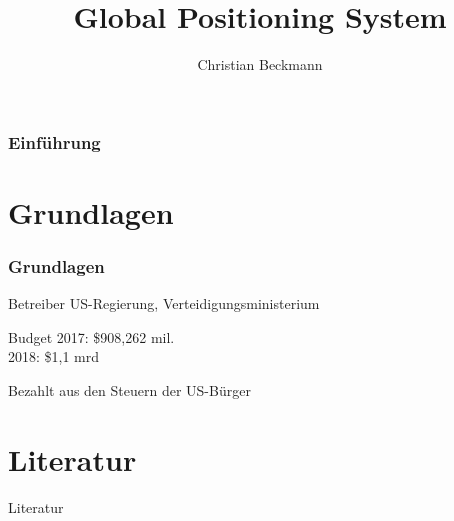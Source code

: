 \documentclass[aspectratio=1609, professionalfonts, 9pt, bibliography=totoc]{beamer}
\title{Global Positioning System}
\author[C.~Beckmann]{Christian Beckmann}
\institute[Seminar Physik des Segelns]{Physik des Segelns \\ Seminar}
\begin{document}
\maketitle

\begin{frame}
    \frametitle{Einführung}
    \tableofcontents[pausesections]
\end{frame}

\section{Grundlagen}
\begin{frame}
	\frametitle{Grundlagen}
    \begin{block}{Betreiber}
        US-Regierung, Verteidigungsministerium
    \end{block}
    \begin{block}{Budget}
        2017: \$908,262 mil.\\
        2018: \$1,1 mrd
    \end{block}
    Bezahlt aus den Steuern der US-Bürger
    \cite{gpsgov}
\end{frame}


\section{Literatur}
\begin{frame}{Literatur}
    \printbibliography
\end{frame}
\end{document}
